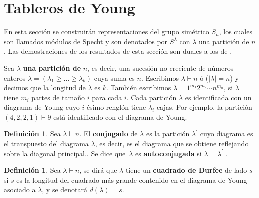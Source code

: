 \documentclass[12pt]{book}
\theoremstyle{definition}
\newtheorem{definition}[theorem]{Definición}
\newcounter{in}
\newcounter{ini}
\begin{document}
\section{Tableros de Young}
\label{rsf}
En esta sección se construirán representaciones del grupo simétrico
$S_n$, los cuales son llamados módulos de Specht y son denotados por
$S^{\lambda}$ con $\lambda$ una partición de $n$. Las demostraciones
de los resultados de esta sección son duales a los de
\cite{sagan2001symmetric}.

Sea $\lambda$ \textbf{una partición de} $n$, es decir, una sucesión no
creciente de números enteros
$\lambda = (\lambda_1\geq \ldots \geq \lambda_k)$ cuya suma es
$n$. Escribimos $\lambda \vdash n$ ó ($\mid \lambda \mid = n$) y
decimos que la longitud de $\lambda$ es $k$. También escribimos
$\lambda = 1^{m_1}2^{m_2} \cdots n^{m_n}$, si $\lambda$ tiene $m_i$
partes de tamaño $i$ para cada $i$. Cada partición $\lambda$ es
identificada con un diagrama de Young cuyo $i$-ésimo renglón tiene
$\lambda_{i}$ cajas. Por ejemplo, la partición $(4,2,2,1) \vdash 9$
está identificado con el diagrama de Young.
\begin{center}
  \begin{minipage}[h]{0.3\linewidth}
    \centering
  \end{minipage} 
\end{center}
\begin{definition}
  Sea $\lambda\vdash n$. El \textbf{conjugado} de $\lambda$ es la
  partición $\lambda^{'}$ cuyo diagrama es el transpuesto del diagrama
  $\lambda$, es decir, es el diagrama que se obtiene reflejando sobre
  la diagonal principal.. Se dice que~$\lambda$ es
  \textbf{autoconjugada} si $\lambda=\lambda^{'}$ .
\end{definition}
\begin{definition}
  Sea $\lambda\vdash n$, se dirá que $\lambda$ tiene un
  \textbf{cuadrado de Durfee} de lado $s$ si $s$ es la longitud del
  cuadrado más grande contenido en el diagrama de Young asociado a
  $\lambda$, y se denotará $d(\lambda) = s$.
\end{definition}
\end{document}
